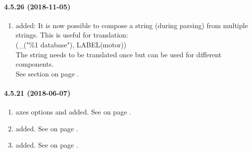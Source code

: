 \paragraph{4.5.26 (2018-11-05)}
\begin{enumerate}
\item \COMPOSESTRING{} added: It is now possible to compose a string (during parsing) from multiple strings.
      This is useful for translation: \\
      \COMPOSESTRING(\_("\%1 database"), LABEL(motor)) \\
      The string needs to be translated once but can be used for different components. \\
      See section  on page \pageref{sec:string}.
\end{enumerate}
\paragraph{4.5.21 (2018-06-07)}
\begin{enumerate}
\item \PLOTTWOD{} axes options \ASPECTRATIOREFAXIS{} and \ASPECTRATIO{} added.
      See  on page \pageref{dia:uiplot2dxaxisoptions}.

\item \SETREASON{} added.
      See  on page \pageref{dia:setfuncstatement}.

\item \SETINDEX{} added.
      See  on page \pageref{dia:setfuncstatement}.

\end{enumerate}
